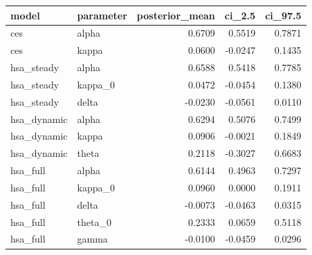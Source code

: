 \begin{tabular}{llrrr}
\toprule
model & parameter & posterior\_mean & ci\_2.5 & ci\_97.5 \\
\midrule
ces & alpha & 0.6709 & 0.5519 & 0.7871 \\
ces & kappa & 0.0600 & -0.0247 & 0.1435 \\
hsa\_steady & alpha & 0.6588 & 0.5418 & 0.7785 \\
hsa\_steady & kappa\_0 & 0.0472 & -0.0454 & 0.1380 \\
hsa\_steady & delta & -0.0230 & -0.0561 & 0.0110 \\
hsa\_dynamic & alpha & 0.6294 & 0.5076 & 0.7499 \\
hsa\_dynamic & kappa & 0.0906 & -0.0021 & 0.1849 \\
hsa\_dynamic & theta & 0.2118 & -0.3027 & 0.6683 \\
hsa\_full & alpha & 0.6144 & 0.4963 & 0.7297 \\
hsa\_full & kappa\_0 & 0.0960 & 0.0000 & 0.1911 \\
hsa\_full & delta & -0.0073 & -0.0463 & 0.0315 \\
hsa\_full & theta\_0 & 0.2333 & 0.0659 & 0.5118 \\
hsa\_full & gamma & -0.0100 & -0.0459 & 0.0296 \\
\bottomrule
\end{tabular}

